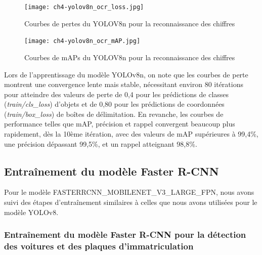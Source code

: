 \begin{figure}[H]
	\centering
	\texttt{[image: ch4-yolov8n\_ocr\_loss.jpg]}
	\caption{Courbes de pertes du YOLOV8n pour la reconnaissance des chiffres}
\label{fig:ch4-yolov8n_ocr_loss}
\end{figure}

\begin{figure}[H]
	\centering
	\texttt{[image: ch4-yolov8n\_ocr\_mAP.jpg]}
	\caption{Courbes de mAPs du YOLOV8n pour la reconnaissance des chiffres}
\label{fig:ch4-yolov8n_ocr_amp}
\end{figure}


Lors de l'apprentissage du modèle YOLOv8n, on note que les courbes de perte montrent une convergence lente mais stable, nécessitant environ 80 itérations pour atteindre des valeurs de perte de 0,4 pour les prédictions de classes (\textit{train/cls\_loss})  d'objets et de 0,80 pour les prédictions de coordonnées (\textit{train/box\_loss}) de boîtes de délimitation. En revanche, les courbes de performance telles que mAP, précision et rappel convergent beaucoup plus rapidement, dès la 10ème itération, avec des valeurs de mAP supérieures à 99,4\%, une précision dépassant 99,5\%, et un rappel atteignant 98,8\%.

\subsection{Entraînement du modèle Faster R-CNN}
Pour le modèle FASTERRCNN\_MOBILENET\_V3\_LARGE\_FPN, nous avons suivi des étapes d'entraînement similaires à celles que nous avons utilisées pour le modèle YOLOv8.

\subsubsection{Entraînement du modèle Faster R-CNN pour la détection des voitures et des plaques d'immatriculation}

